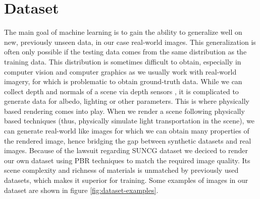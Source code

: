 \chapter{Dataset}
\label{kap:dataset}
The main goal of machine learning is to gain the ability to generalize well on new, previously unseen data, in our case real-world images. This generalization is often only possible if the testing data comes from the same distribution as the training data. This distribution is sometimes difficult to obtain, especially in computer vision and computer graphics as we usually work with real-world imagery, for which is problematic to obtain ground-truth data. While we can collect depth and normals of a scene via depth sensors \cite{nyuv2}, it is complicated to generate data for albedo, lighting or other parameters.
\newline
This is where physically based rendering comes into play. When we render a scene following physically based techniques (thus, physically simulate light transportation in the scene), we can generate real-world like images for which we can obtain many properties of the rendered image, hence bridging the gap between synthetic datasets and real images.
\newline
Because of the lawsuit regarding SUNCG dataset we deciced to render our own dataset using PBR techniques to match the required image quality. Its scene complexity and richness of materials is unmatched by previously used datasets, which makes it superior for training. Some examples of images in our dataset are shown in figure \ref{fig:dataset-examples}.
